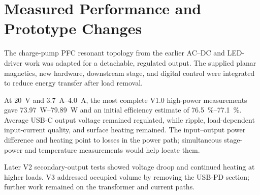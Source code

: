 \section{Measured Performance and Prototype Changes}
\label{sec:disc-findings}

The charge-pump PFC resonant topology from the earlier AC--DC and LED-driver
work \cite{ammar2020chargepump,ammar2021led} was adapted for a detachable,
regulated output. The supplied planar magnetics, new hardware, downstream
stage, and digital control were integrated to reduce energy transfer after
load removal.

At \SI{20}{\volt} and \SIrange{3.7}{4.0}{\ampere}, the most complete
V1.0 high-power measurements gave \SIrange{73.97}{79.89}{\watt} and an initial
efficiency estimate of \SIrange{76.5}{77.1}{\percent}. Average USB-C output
voltage remained regulated, while ripple, load-dependent input-current quality,
and surface heating remained. The input--output power difference and heating
point to losses in the power path; simultaneous stage-power and temperature
measurements would help locate them.

Later V2 secondary-output tests showed voltage droop and continued heating at higher loads. V3 addressed occupied volume by removing the USB-PD section; further work remained on the transformer and current paths.
